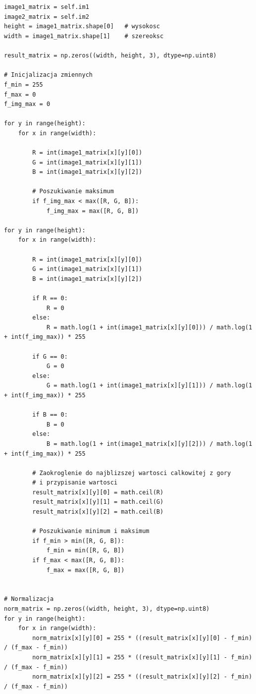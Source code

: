 \documentclass[final,a4paper,openany,12pt]{mwbk}
\begin{document}
\begin{lstlisting}[caption=Logarytmowanie obrazu barwowego]


image1_matrix = self.im1
image2_matrix = self.im2
height = image1_matrix.shape[0]   # wysokosc
width = image1_matrix.shape[1]    # szereoksc

result_matrix = np.zeros((width, height, 3), dtype=np.uint8)

# Inicjalizacja zmiennych
f_min = 255
f_max = 0
f_img_max = 0

for y in range(height):
    for x in range(width):  
        
        R = int(image1_matrix[x][y][0])
        G = int(image1_matrix[x][y][1])
        B = int(image1_matrix[x][y][2])

        # Poszukiwanie maksimum                
        if f_img_max < max([R, G, B]):
            f_img_max = max([R, G, B])

for y in range(height):
    for x in range(width):  
        
        R = int(image1_matrix[x][y][0])
        G = int(image1_matrix[x][y][1])
        B = int(image1_matrix[x][y][2])

        if R == 0:
            R = 0
        else:
            R = math.log(1 + int(image1_matrix[x][y][0])) / math.log(1 + int(f_img_max)) * 255

        if G == 0:
            G = 0
        else:
            G = math.log(1 + int(image1_matrix[x][y][1])) / math.log(1 + int(f_img_max)) * 255
        
        if B == 0:
            B = 0
        else:
            B = math.log(1 + int(image1_matrix[x][y][2])) / math.log(1 + int(f_img_max)) * 255

        # Zaokroglenie do najblizszej wartosci calkowitej z gory
        # i przypisanie wartosci
        result_matrix[x][y][0] = math.ceil(R)
        result_matrix[x][y][1] = math.ceil(G)
        result_matrix[x][y][2] = math.ceil(B)

        # Poszukiwanie minimum i maksimum                
        if f_min > min([R, G, B]):
            f_min = min([R, G, B])
        if f_max < max([R, G, B]):
            f_max = max([R, G, B])


# Normalizacja
norm_matrix = np.zeros((width, height, 3), dtype=np.uint8)
for y in range(height):
    for x in range(width):
        norm_matrix[x][y][0] = 255 * ((result_matrix[x][y][0] - f_min) / (f_max - f_min))
        norm_matrix[x][y][1] = 255 * ((result_matrix[x][y][1] - f_min) / (f_max - f_min))
        norm_matrix[x][y][2] = 255 * ((result_matrix[x][y][2] - f_min) / (f_max - f_min))

\end{lstlisting}
\end{document}
